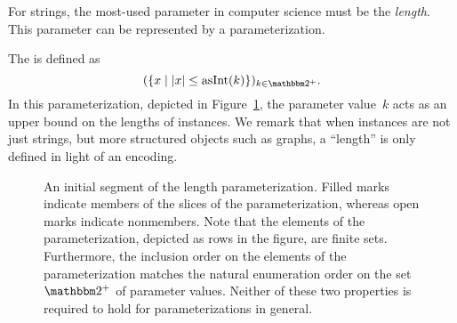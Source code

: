 For strings, the most-used parameter in computer science must be the \emph{length}.
This parameter can be represented by a parameterization.
\begin{example}
\label{ex:length_parameterization}%
  The  \parencite[see also][Example~1.6]{flum2006parameterized} is defined as
  \begin{equation*}
    (\{x \st \length{x} \le \asNat(k)\})_{k \in \binary^+}.
  \end{equation*}
  In this parameterization, depicted in Figure~\ref{fig:length_parameterization}, the parameter value~$k$ acts as an upper bound on the lengths of instances.
  We remark that when instances are not just strings, but more structured objects such as graphs, a \enquote{length} is only defined in light of an encoding.
  \begin{figure}
    \centering
    \caption{
      An initial segment of the length parameterization.
      Filled marks indicate members of the slices of the parameterization, whereas open marks indicate nonmembers.
      Note that the elements of the parameterization, depicted as rows in the figure, are finite sets.
      Furthermore, the inclusion order on the elements of the parameterization matches the natural enumeration order on the set~$\binary^+$ of parameter values.
      Neither of these two properties is required to hold for parameterizations in general.
    }
    \label{fig:length_parameterization}
  \end{figure}
\end{example}

